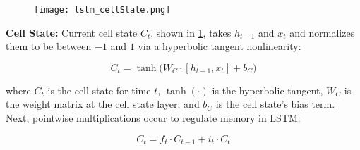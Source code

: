 \begin{program}

\begin{figure}
\begin{center}
    \vspace{-30pt}
    \texttt{[image: lstm\_cellState.png]}    
\end{center}
\label{fig:cellState}
\end{figure}

\ContentFontSize

\textbf{Cell State: } Current cell state $C_t$, shown in \cref{fig:cellState}, takes $h_{t-1}$ and $x_t$ and normalizes them to be between $-1$ and $1$ via a hyperbolic tangent nonlinearity:

\begin{equation}
C_t = \tanh \Big( W_C \cdot [h_{t-1}, x_t] + b_C \Big)
\end{equation}

where $C_t$ is the cell state for time $t$, $\tanh(\cdot)$ is the hyperbolic tangent, $W_C$ is the weight matrix at the cell state layer, and $b_C$ is the cell state's bias term. Next, pointwise multiplications occur to regulate memory in LSTM: 

\begin{equation}
C_t = f_t \cdot C_{t-1} + i_t \cdot C_t
\end{equation}

\end{program}





